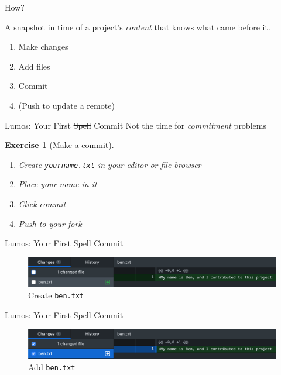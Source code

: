 \documentclass{beamer}
\theoremstyle{example}
\newtheorem{exercise}{Exercise}
\begin{document}
\begin{frame}{How?}
    \begin{definition}[Commit]
        A snapshot in time of a project's \emph{content} that knows what came
        before it.
    \end{definition}
    \begin{enumerate}
        \item Make changes
        \item Add files
        \item Commit
        \item (Push to update a remote)
    \end{enumerate}
\end{frame}

\begin{frame}[fragile]{Lumos: Your First \sout{Spell} Commit}
    {Not the time for \emph{commitment} problems}
    \begin{exercise}[Make a commit]
        \begin{enumerate}
            \item Create \texttt{yourname.txt} in your editor or file-browser
            \item Place your name in it
            \item Click commit
            \item Push to your fork
        \end{enumerate}
    \end{exercise}
\end{frame}

\begin{frame}{Lumos: Your First \sout{Spell} Commit}
    \begin{figure}
        \includegraphics[scale=0.4]{img/create_ben}
        \caption{Create \texttt{ben.txt}}
    \end{figure}
\end{frame}

\begin{frame}{Lumos: Your First \sout{Spell} Commit}
    \begin{figure}
        \includegraphics[scale=0.4]{img/add_ben}
        \caption{Add \texttt{ben.txt}}
    \end{figure}
\end{frame}
\end{document}
